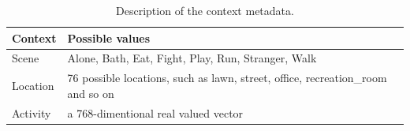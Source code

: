 \begin{table}[th]
\small
\begin{tabular}{p{}|p{}}
\toprule
\textbf{Context} & \textbf{Possible values} \\ \midrule
Scene & Alone, Bath, Eat, Fight, Play, Run, Stranger, Walk \\ \midrule

Location & 76 possible locations, such as lawn, street, office, recreation\_room and so on \\ \midrule

Activity & a 768-dimentional real valued vector \\ 
\bottomrule
\end{tabular}
\caption{Description of the context metadata. %
}
\label{tab:context}
\end{table}


